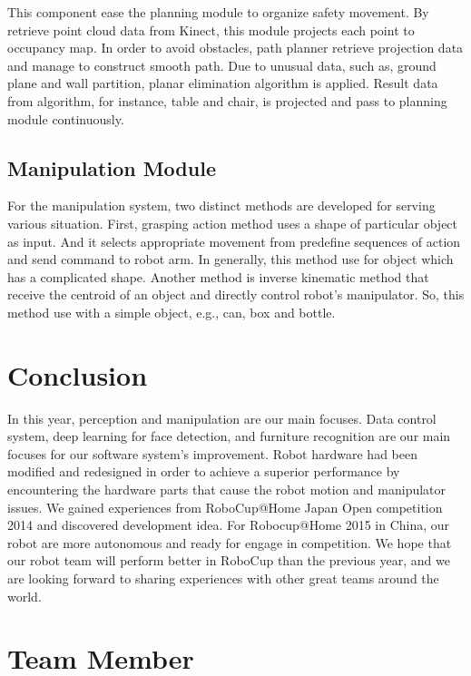 \documentclass{llncs}
\begin{document}
This component ease the planning module to organize safety movement. By retrieve point cloud data from Kinect, this module projects each point to occupancy map. In order to avoid obstacles, path planner retrieve projection data and manage to construct smooth path. Due to unusual data, such as, ground plane and wall partition, planar elimination algorithm is applied. Result data from algorithm, for instance, table and chair, is projected and pass to planning module continuously\cite{avoid}.

\subsection{Manipulation Module}

For the manipulation system, two distinct methods are developed for serving various situation. First, grasping action method uses a shape of particular object as input. And it selects appropriate movement from predefine sequences of action and send command to robot arm. In generally, this method use for object which has a complicated shape. Another method is inverse kinematic method that receive the centroid of an object and directly control robot's manipulator. So, this method use with a simple object, e.g., can, box and bottle.

\section{Conclusion}

In this year, perception and manipulation are our main focuses. Data control system, deep learning for face detection, and furniture recognition are our main focuses for our software system's improvement. Robot hardware had been modified and redesigned in order to achieve a superior performance by encountering the hardware parts that cause the robot motion and manipulator issues. We gained experiences from RoboCup@Home Japan Open competition 2014 and discovered development idea. For Robocup@Home 2015 in China, our robot are more autonomous and ready for engage in competition. We hope that our robot team will perform better in RoboCup than the previous year, and we are looking forward to sharing experiences with other great teams around the world.

\section*{Team Member}
\end{document}
